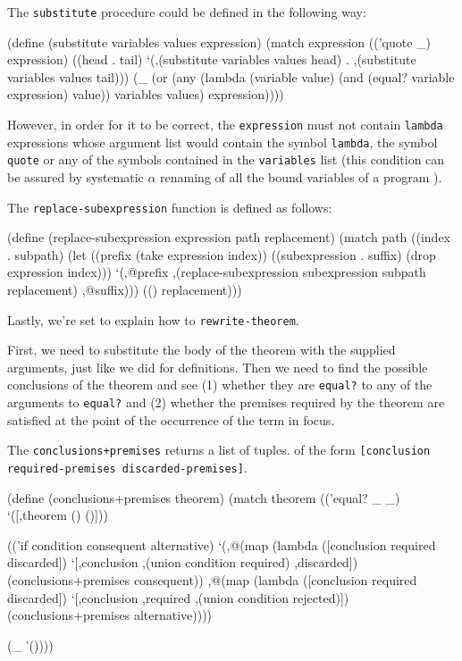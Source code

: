 The \texttt{substitute} procedure could be defined in the following
way\label{substitute}:

\begin{Snippet}
  (define (substitute variables values expression)
    (match expression
      (('quote _)
       expression)
      ((head . tail)
       `(,(substitute variables values head)
         . ,(substitute variables values tail)))
      (_
       (or (any (lambda (variable value)
                  (and (equal? variable expression)
		       value))
	        variables values)
	   expression))))
\end{Snippet}

However, in order for it to be correct, the \texttt{expression}
must not contain \texttt{lambda} expressions whose argument list
would contain the symbol \texttt{lambda}, the symbol \texttt{quote}
or any of the symbols contained in the \texttt{variables} list
(this condition can be assured by systematic $\alpha$ renaming
of all the bound variables of a program \cite{SussmanSteele1976}).

The \texttt{replace-subexpression} function is defined as follows:

\begin{Snippet}
  (define (replace-subexpression expression path replacement)
    (match path
      ((index . subpath)
       (let ((prefix (take expression index))
             ((subexpression . suffix) (drop expression index)))
         `(,@prefix
           ,(replace-subexpression subexpression subpath
			           replacement)
	   ,@suffix)))
      (()
       replacement)))
\end{Snippet}

Lastly, we're set to explain how to \texttt{rewrite-theorem}.

First, we need to substitute the body of the theorem with
the supplied arguments, just like we did for definitions.
Then we need to find the possible conclusions of the theorem
and see (1) whether they are \texttt{equal?} to any of the
arguments to \texttt{equal?} and (2) whether the premises
required by the theorem are satisfied at the point of the
occurrence of the term in focus.

The \texttt{conclusions+premises} returns a list of tuples.
of the form \texttt{[conclu\-sion required-premises
    discarded-premises]}.

\begin{Snippet}
  (define (conclusions+premises theorem)
    (match theorem
      (('equal? _ _)
       `([,theorem () ()]))
  
      (('if condition consequent alternative)
       `(,@(map (lambda ([conclusion required discarded])
                  `[,conclusion
                    ,(union condition required)
                    ,discarded])
                (conclusions+premises consequent))
         ,@(map (lambda ([conclusion required discarded])
                  `[,conclusion
                    ,required
                    ,(union condition rejected)])
                (conclusions+premises alternative))))

      (_
       '())))
\end{Snippet}

